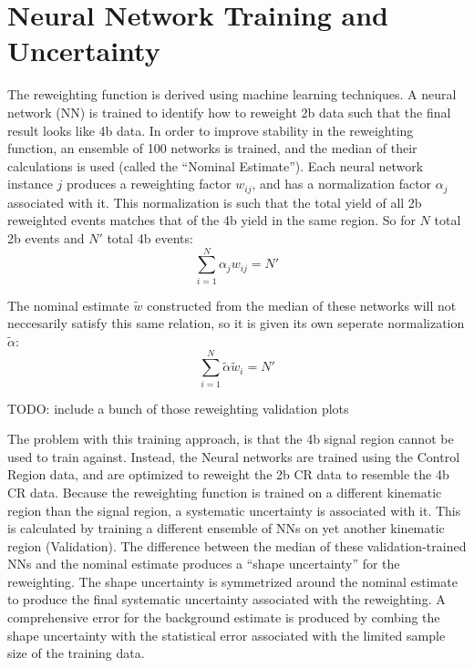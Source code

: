 \section{Neural Network Training and Uncertainty}

    The reweighting function is derived using machine learning techniques.
    A neural network (NN) is trained to identify how to reweight 2b data such that the final result looks like 4b data.
    In order to improve stability in the reweighting function,
        an ensemble of 100 networks is trained, and the median of their calculations is used (called the ``Nominal Estimate'').
    Each neural network instance $j$ produces a reweighting factor $w_{ij}$, and has a normalization factor $\alpha_j$ associated with it.
    This normalization is such that the total yield of all 2b reweighted events matches that of the 4b yield in the same region.
    So for $N$ total 2b events and $N'$ total 4b events:
        \begin{equation}
        \sum_{i=1}^{N} \alpha_j w_{ij} = N'
        \end{equation}

    The nominal estimate $\tilde{w}$ constructed from the median of these networks will not neccesarily satisfy this same relation,
        so it is given its own seperate normalization $\tilde \alpha$:
        \begin{equation}
        \sum_{i=1}^{N} \tilde \alpha \tilde w_i = N'
        \end{equation}

        TODO: include a bunch of those reweighting validation plots

    The problem with this training approach, is that the 4b signal region cannot be used to train against.
    Instead, the Neural networks are trained using the Control Region data,
        and are optimized to reweight the 2b CR data to resemble the 4b CR data.
    Because the reweighting function is trained on a different kinematic region than the signal region,
        a systematic uncertainty is associated with it.
    This is calculated by training a different ensemble of NNs on yet another kinematic region (Validation).
    The difference between the median of these validation-trained NNs and the nominal estimate
        produces a ``shape uncertainty'' for the reweighting.
    The shape uncertainty is symmetrized around the nominal estimate to produce the final systematic uncertainty
        associated with the reweighting.
    A comprehensive error for the background estimate is produced by combing the shape uncertainty with the statistical error
        associated with the limited sample size of the training data.


